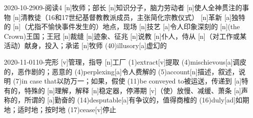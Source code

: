 \documentclass[12pt]{ctexart}
\begin{document}
\begin{wordlist}{2020-10-29}{09-阅读4}
  [n]{牧师；部长}
  [n]{知识分子，脑力劳动者}
  [n]{使人全神贯注的事物}
  [n]{清教徒（16和17世纪基督教教派成员，主张简化宗教仪式）}
  [n]{革新}
  [a]{独特的}
  [n]{（尤指不愉快事件发生的）地点，现场}
  [n]{技艺}
  [a]{令人印象深刻的}
  [n]{(the Crown)王国；王冠}
  [n]{裁缝}
  [n]{迹象、征兆}
  [n]{说教}
  [n]{仆人，侍从}
  [n]{（对工作或某活动）献身，投入；承诺}
  [n]{牧师}
  \word(40){illusory}[a]{虚幻的}
\end{wordlist}

\begin{wordlist}{2020-11-01}{10-完形}
  [v]{管理，指导}
  [n]{工厂}
  \word(1){extract}[v]{提取}
  \word[2020-11-03](4){mischievous}[a]{调皮的，恶作剧的；恶意的}
  \word[2020-11-03](4){perplexing}[a]{令人费解的}
  \word(5){account}[n]{描述，叙述，说明}
  \word(7){in case that}{以防万一；如果，假使}
  \word(11){be conveyed to}{被运送，传递到}
  [a]{特有的，特殊的}
  [n]{理解，解释}
  [n]{稳定器，停滞期}
  [v]{（使）放慢、减缓、萧条}
  [a]{声称的，所谓的}
  [a]{勤奋的}
  \word[2020-11-03](14){desputable}[a]{有争议的，值得商榷的}
  \word(16){duly}[ad]{如期地；适时地；按时地}
  \word[2020-11-13](17){cease}[v]{停止}
\end{wordlist}
\end{document}
